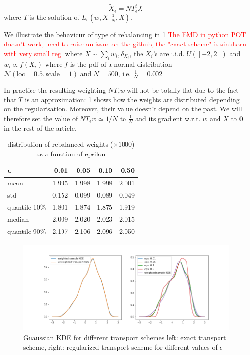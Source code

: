 \documentclass[%
reprint,
amsmath,amssymb,
aps,
]{revtex4-2}
\newcommand\todo[1]{\textcolor{red}{#1}}
\begin{document}
		$$\tilde{X}_{\epsilon} = N T_{\epsilon}^t X$$ where $T$ is the solution of $L_{\epsilon}(w, X, \frac{1}{N}, X)$.
			
		
		We illustrate the behaviour of type of rebalancing in \cref{fig:rebalancing_map} \todo{The EMD in python POT doesn't work, need to raise an issue on the github, the "exact scheme" is sinkhorn with very small reg}, where $X \sim \sum_i w_i, \delta_{X_i}$, the $X_i$'s are i.i.d. $U([-2, 2])$ and $w_i \propto f(X_i)$ where $f$ is the pdf of a normal distribution $\mathcal{N}(\text{loc}=0.5, \text{scale}=1)$ and $N = 500$, i.e. $\frac{1}{N} = 0.002$ \label{def:example}
		
		In practice the resulting weighting $N T_{\epsilon} w$ will not be totally flat due to the fact that $T$ is an approximation: \cref{tab:transformedWeights} shows how the weights are distributed depending on the regularisation. Moreover, their value doesn't depend on the past. We will therefore set the value of $N T_{\epsilon} w \simeq 1/N$  to $\frac{1}{N}$ and its gradient w.r.t. $w$ and $X$ to $\mathbf{0}$ in the rest of the article.
		
		
		\begin{table}
			\begin{tabular}{lrrrr}
				\toprule
				$\bm{\epsilon}$ &        0.01 &       0.05 &       0.10 &       0.50 \\
				\midrule
					mean  &      1.995 &      1.998 &      1.998 &      2.001 \\
					std   &      0.152 &      0.099 &      0.089 &      0.049 \\
					quantile 10\%   &      1.801 &      1.874 &      1.875 &      1.919 \\
					median   &      2.009 &      2.020 &      2.023 &      2.015 \\
					quantile 90\%   &      2.197 &      2.106 &      2.096 &      2.050 \\
				\bottomrule
			\end{tabular}
			\label{tab:transformedWeights}
			\caption{distribution of rebalanced weights ($\times 100$0) as a function of epsilon}
		\end{table}
		
		
		\begin{figure}
			\includegraphics[width=\linewidth]{KDEIllustration}
			\caption{
				Guaussian KDE for different transport schemes
				left: exact transport scheme, right: regularized transport scheme for different values of $\epsilon$}
			\label{fig:rebalancing_map}
		\end{figure}	
	
\end{document}
